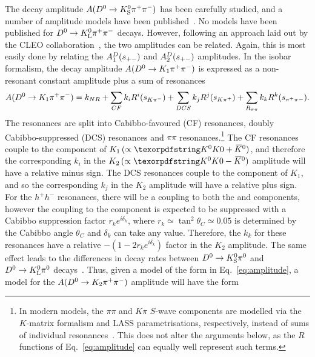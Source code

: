 
The decay amplitude $A({{D}^0}\rightarrow{\ensuremath{{K}^0_{\mathrm{S}}}}\pi^+\pi^-)$ has been carefully studied, and a number of amplitude models have been published~\cite{BABAR2005,BABAR2008,BABAR2010,BELLE2010,Belle2018}. No models have been published for ${{D}^0}\rightarrow{\ensuremath{{K}^0_{\mathrm{L}}}} \pi^+\pi^-$  decays. However, following an approach laid out by the CLEO collaboration~\cite{CLEOCISI}, the two amplitudes can be related. Again, this is most easily done by relating the  $A^{D}_1(s_{+-})$ and $A^{D}_2(s_{+-})$ amplitudes. In the isobar formalism, the decay amplitude $A({{D}^0}\rightarrow K_1 \pi^+\pi^-)$ is expressed as a non-resonant constant amplitude plus a sum of resonances
\begin{align}\label{eq:amplitude}
    A({{D}^0}\rightarrow K_1 \pi^+\pi^-) = k_{NR} + \sum_{CF} k_i R^i(s_{K\pi^-}) + \sum_{DCS} k_j R^j(s_{K\pi^+}) + \sum_{R_{\pi\pi}} k_k R^k(s_{\pi^+\pi-}).
\end{align}
The resonances are split into Cabibbo-favoured (CF) \Kstarm resonances, doubly Cabibbo-suppressed (DCS) \Kstarp resonances and $\pi\pi$ resonances.\footnote{In modern models, the $\pi\pi$ and $K\pi$ $S$-wave components are modelled via the $K$-matrix formalism and LASS parametrisations, respectively, instead of sums of individual resonances~\cite{Belle2018}. This does not alter the arguments below, as the $R$ functions of Eq.~\eqref{eq:amplitude} can equally well represent such terms.} The CF resonances couple to the \Kzb component of $K_1\,(\propto \Kz+\Kzb)$, and therefore the corresponding $k_i$ in the $K_2\,(\propto \Kz-\Kzb)$ amplitude will have a relative minus sign. The DCS resonances couple to the \Kz component of $K_1$, and so the corresponding $k_j$ in the $K_2$ amplitude will have a relative plus sign. For the $h^+h^-$ resonances, there will be a coupling to both the \Kz and \Kzb components, however the coupling to the \Kz component is expected to be suppressed with a Cabibbo suppression factor $r_ke^{i\delta_k}$, where $r_k\simeq\tan^2\theta_C \simeq 0.05$ is determined by the Cabibbo angle $\theta_C$ and $\delta_k$ can take any value.  Therefore, the $k_k$ for these resonances have a relative $-(1-2r_ke^{i\delta_k})$ factor in the $K_2$ amplitude. The same effect leads to the differences in decay rates between ${{D}^0}\rightarrow{\ensuremath{{K}^0_{\mathrm{S}}}}{\ensuremath{{\pi}^0}}$ and ${{D}^0}\rightarrow{\ensuremath{{K}^0_{\mathrm{L}}}}{\ensuremath{{\pi}^0}}$ decays~\cite{bigiInterferenceCabibboAllowed1995,cleocollaborationComparisonEnsuremathRightarrowK2008}. Thus, given a model of the form in Eq.~\eqref{eq:amplitude}, a model for the $A({{D}^0}\rightarrow K_2 \pi^+\pi^-)$ amplitude will have the form
